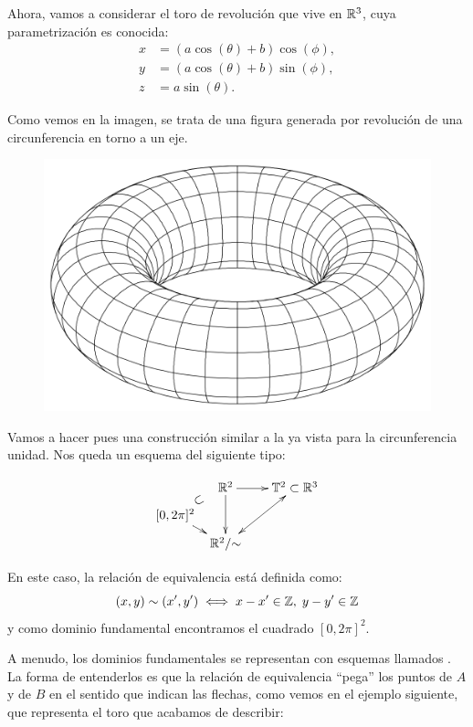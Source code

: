 \begin{exa}
	Ahora, vamos a considerar el toro de revolución que vive en $\mathbb{R}^3$, cuya parametrización es conocida:
	\[\begin{split}
	x&=(a\cos(\theta)+b)\cos(\phi),\\
	y&=(a\cos(\theta)+b)\sin(\phi),\\
	z&=a\sin(\theta).
	\end{split}\]
	
	Como vemos en la imagen, se trata de una figura generada por revolución de una circunferencia en torno a un eje.
	
	\begin{figure}[h!]
		\centering
		\includegraphics[scale = 0.15]{img/toro}
	\end{figure}
	
	Vamos a hacer pues una construcción similar a la ya vista para la circunferencia unidad. Nos queda un esquema del siguiente tipo:
	
	\[\xymatrix @C=0.5pc @R=0.5pc @L=-0.2pc {
		& \R^2\ar[rr] \ar[dd] & &
		\toro^2\subset\R^3 \\
		[0,2\pi]^2 \ar@{}[ur]^*[@]{\subset} \ar[dr] \\
		& \R^2/\mathord{\sim}  \ar@{<->}[rruu]
	}\]
	
	En este caso, la relación de equivalencia está definida como:
	\[(x,y)\sim (x',y')\iff x-x'\in\mathbb{Z},\;y-y'\in\mathbb{Z}\]
	y como dominio fundamental encontramos el cuadrado $[0,2\pi]^2$. 
	
	A menudo, los dominios fundamentales se representan con esquemas llamados . La forma de entenderlos es que la relación de equivalencia ``pega'' los puntos de $A$ y de $B$ en el sentido que indican las flechas, como vemos en el ejemplo siguiente, que representa el toro que acabamos de describir:
	

\end{exa}
